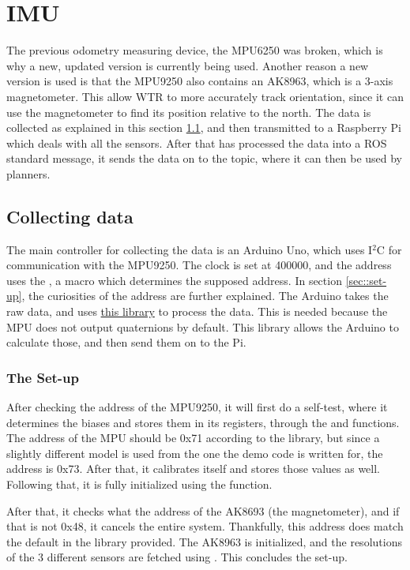 \section{IMU}
The previous odometry measuring device, the MPU6250 \cite{mpu6250} was broken, which is why a new, updated version is currently being used.
Another reason a new version is used is that the MPU9250 \cite{MPU9250} also contains an AK8963, which is a 3-axis magnetometer.
This allow WTR to more accurately track orientation, since it can use the magnetometer to find its position relative to the north.
The data is collected as explained in this section \ref{sec::collect}, and then transmitted to a Raspberry Pi which deals with all the sensors.
After that has processed the data into a ROS standard message, it sends the data on to the topic, where it can then be used by planners.

\subsection{Collecting data} \label{sec::collect}
The main controller for collecting the data is an Arduino Uno, which uses I$^{2}$C for communication with the MPU9250.
The clock is set at 400000, and the address uses the , a macro which determines the supposed address.
In section \ref{sec::set-up}, the curiosities of the address are further explained.
The Arduino takes the raw data, and uses \href{https://github.com/sparkfun/SparkFun_MPU-9250_Breakout_Arduino_Library}{this library} to process the data.
This is needed because the MPU does not output quaternions by default.
This library allows the Arduino to calculate those, and then send them on to the Pi.


\subsubsection{The Set-up} \label{sec::setup}
After checking the address of the MPU9250, it will first do a self-test, where it determines the biases and stores them in its registers, through the  and  functions.
The address of the MPU should be 0x71 according to the library, but since a slightly different model is used from the one the demo code is written for, the address is 0x73.
After that, it calibrates itself and stores those values as well.
Following that, it is fully initialized using the  function.

After that, it checks what the address of the AK8693 (the magnetometer), and if that is not 0x48, it cancels the entire system.
Thankfully, this address does match the default in the library provided.
The AK8963 is initialized, and the resolutions of the 3 different sensors are fetched using .
This concludes the set-up.


